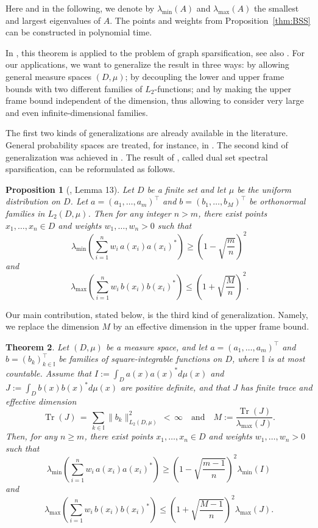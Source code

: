 \documentclass[a4paper,11pt]{article}
\renewcommand{\(}{\left (}
\renewcommand{\)}{\right )}
\newcommand{\<}{\langle}
\renewcommand{\>}{\rangle}
\newtheorem{theorem}{Theorem}
\newtheorem{prop}[theorem]{Proposition}
\theoremstyle{definition}
\DeclareMathOperator{\Tr}{Tr}
\begin{document}
Here and in the following, we denote by 
$\lambda_{\min}(A)$ and $\lambda_{\max}(A)$ the smallest and largest eigenvalues of $A$.
The points and weights from Proposition~\ref{thm:BSS} can be constructed in polynomial time.

In \cite{BSS}, this theorem is applied to the problem of graph sparsification, see also \cite{HGN+24,SS11,ST11}.
For our applications, we want to generalize the result in three ways: by allowing general measure spaces $(D,\mu)$; by decoupling the lower and upper frame bounds with two different
families of $L_2$-functions; and by making the upper frame bound independent of the dimension, thus allowing to consider very large and even infinite-dimensional families. 

The first two kinds of generalizations are already available in the literature. General probability spaces are treated, for instance, in \cite[Theorem~6.4]{DPSTT}.
The second kind of generalization was achieved in \cite{BDM14}.
The result of \cite{BDM14}, called dual set spectral sparsification, can be reformulated as follows.

\begin{prop}[\cite{BDM14}, Lemma 13]
\label{prop:BDM}
Let $D$ be a finite set and let $\mu$ be the uniform distribution on $D$. Let $a=(a_1,\hdots,a_m)^\top$ and $b=(b_1,\dots,b_M)^\top$
be orthonormal families in $L_2(D,\mu)$.
Then for any integer $n>m$, there exist points $x_1,\dots,x_n\in D$ and weights ${w_1,\dots,w_n>0}$ such that
\[
\lambda_{\min}\left( \sum_{i=1}^{n} w_i\, 
a(x_i)a(x_i)^* \right) \geq
\left(1-\sqrt{\frac{m}{n}}\right)^2
\]
and
\[
\,
\lambda_{\max}\left(\sum_{i=1}^{n} w_i\, b(x_i)b(x_i)^* \right) \leq \left(1+\sqrt{\frac{M}{n}}\right)^2.
\]
\end{prop}

Our main contribution, stated below, is the third kind of generalization. Namely, we replace the dimension $M$ by an effective dimension in the
upper frame bound.
\smallskip

\begin{theorem}
\label{thm:main}
Let $(D,\mu)$ be a measure space, and let $a=(a_1,\hdots,a_m)^\top$
and $b= (b_k)_{k\in \mathbb I}^\top$ be families of square-integrable functions on $D$,
where $\mathbb I$ is at most countable.
Assume that $I:=\int_D a(x)a(x)^*d\mu(x)$ and $J:=\int_D b(x)b(x)^*d\mu(x)$ are positive definite, and that $J$
has finite trace and effective dimension
\[
\Tr(J) \,=\, \sum_{k\in \mathbb I} \|b_k\|_{L_2(D,\mu)}^2 \,<\,\infty
\quad\text{and}\quad M:=\frac{\Tr(J)}{\lambda_{\max}(J)}.
\]
Then, for any
$n\geq m$, there exist points $x_1,\dots,x_n\in D$ and weights ${w_1,\dots,w_n>0}$ such that
\[
\lambda_{\min}\left( \sum_{i=1}^{n} w_i\, 
a(x_i)a(x_i)^* \right) \geq
\left(1-\sqrt{\frac{m-1}{n}}\right)^2
\lambda_{\min}(I)
\]
and
\[
\lambda_{\max}\left(\sum_{i=1}^{n} w_i\, b(x_i)b(x_i)^* \right) \leq \left(1+\sqrt{\frac{M-1}{n}}\right)^2
\lambda_{\max}(J).
\]
\end{theorem}
\end{document}
